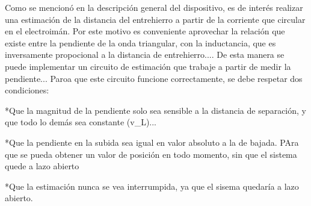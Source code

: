 Como se mencionó en la descripción general del dispositivo, es de interés realizar una estimación de la distancia del entrehierro a partir de la corriente que circular en el electroimán. Por este motivo es conveniente aprovechar la relación que existe entre la pendiente de la onda triangular, con la inductancia, que es inversamente propocional a la distancia de entrehierro.... De esta manera se puede implementar un circuito de estimación que trabaje a partir de medir la pendiente... Paroa que este circuito funcione correctamente, se debe respetar dos condiciones:

*Que la magnitud de la pendiente solo sea sensible a la distancia de separación, y que todo lo demás sea constante (v_L)...

*Que la pendiente en la subida sea igual en valor absoluto a la de bajada.  PAra que se pueda obtener un valor de posición en todo momento, sin que el sistema quede a lazo abierto

*Que la estimación nunca se vea interrumpida, ya que el sisema quedaría a lazo abierto.
